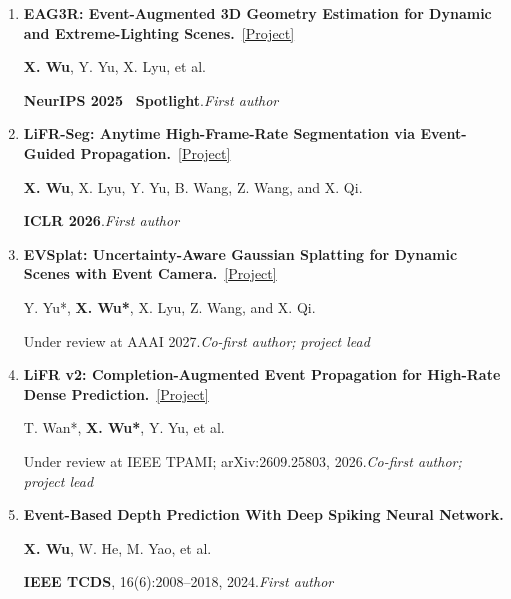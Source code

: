 \documentclass[a4paper]{article}
\newcommand{\pubnote}[1]{\par{\color{cvgray}#1}}
\begin{document}
{\begin{enumerate}[leftmargin=1.6em,labelsep=0.38em,itemsep=0.4pt,topsep=1.3pt,parsep=0pt,partopsep=0pt]
Y. Yu*, \textbf{X. Wu*}, X. Hu, et al.\par
arXiv:2512.04519, 2025.\hfill\textcolor{cvblue}{\textit{Co-first author}}
\pubnote{Local attention and recurrent state-space memory retain short- and long-range context for video generation.}
\item \textbf{EAG3R: Event-Augmented 3D Geometry Estimation for Dynamic and Extreme-Lighting Scenes.}~\href{https://candy-crusher.github.io/xiaoshanwu.github.io/projects/eag3r/}{\textcolor{cvblue}{[Project]}}\par
\textbf{X. Wu}, Y. Yu, X. Lyu, et al.\par
\textbf{NeurIPS 2025} \textcolor{cvred}{\textbf{\textperiodcentered\ Spotlight}}.\hfill\textcolor{cvblue}{\textit{First author}}
\item \textbf{LiFR-Seg: Anytime High-Frame-Rate Segmentation via Event-Guided Propagation.}~\href{https://candy-crusher.github.io/xiaoshanwu.github.io/projects/lifr-seg/}{\textcolor{cvblue}{[Project]}}\par
\textbf{X. Wu}, X. Lyu, Y. Yu, B. Wang, Z. Wang, and X. Qi.\par
\textbf{ICLR 2026}.\hfill\textcolor{cvblue}{\textit{First author}}
\item \textbf{EVSplat: Uncertainty-Aware Gaussian Splatting for Dynamic Scenes with Event Camera.}~\href{https://candy-crusher.github.io/xiaoshanwu.github.io/projects/evsplat/}{\textcolor{cvblue}{[Project]}}\par
Y. Yu*, \textbf{X. Wu*\textdagger}, X. Lyu, Z. Wang, and X. Qi.\par
Under review at AAAI 2027.\hfill\textcolor{cvblue}{\textit{Co-first author; project lead}}
\item \textbf{LiFR v2: Completion-Augmented Event Propagation for High-Rate Dense Prediction.}~\href{https://candy-crusher.github.io/xiaoshanwu.github.io/projects/lifr-v2/}{\textcolor{cvblue}{[Project]}}\par
T. Wan*, \textbf{X. Wu*\textdagger}, Y. Yu, et al.\par
Under review at IEEE TPAMI; arXiv:2609.25803, 2026.\hfill\textcolor{cvblue}{\textit{Co-first author; project lead}}
\item \textbf{Event-Based Depth Prediction With Deep Spiking Neural Network.}\par
\textbf{X. Wu}, W. He, M. Yao, et al.\par
\textbf{IEEE TCDS}, 16(6):2008--2018, 2024.\hfill\textcolor{cvblue}{\textit{First author}}
\end{enumerate}
}
\end{document}
